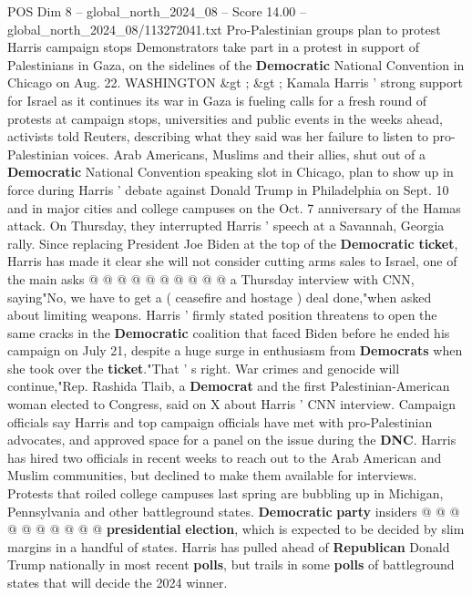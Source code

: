 \begin{textsample}{POS Dim 8 – global\_north\_2024\_08 – Score 14.00 – global\_north\_2024\_08/113272041.txt}  \label{ex:f8_pos_039}
Pro-Palestinian groups plan to protest Harris campaign stops Demonstrators take part in a protest in support of Palestinians in Gaza, on the sidelines of the \textbf{Democratic} National Convention in Chicago on Aug. 22.
WASHINGTON \&gt ; \&gt ; Kamala Harris ' strong support for Israel as it continues its war in Gaza is fueling calls for a fresh round of protests at campaign stops, universities and public events in the weeks ahead, activists told Reuters, describing what they said was her failure to listen to pro-Palestinian voices.
Arab Americans, Muslims and their allies, shut out of a \textbf{Democratic} National Convention speaking slot in Chicago, plan to show up in force during Harris ' debate against Donald Trump in Philadelphia on Sept. 10 and in major cities and college campuses on the Oct. 7 anniversary of the Hamas attack.
On Thursday, they interrupted Harris ' speech at a Savannah, Georgia rally.
Since replacing President Joe Biden at the top of the \textbf{Democratic} \textbf{ticket}, Harris has made it clear she will not consider cutting arms sales to Israel, one of the main asks @ @ @ @ @ @ @ @ @ @ a Thursday interview with CNN, saying"No, we have to get a ( ceasefire and hostage ) deal done,"when asked about limiting weapons.
Harris ' firmly stated position threatens to open the same cracks in the \textbf{Democratic} coalition that faced Biden before he ended his campaign on July 21, despite a huge surge in enthusiasm from \textbf{Democrats} when she took over the \textbf{ticket}."That ' s right.
War crimes and genocide will continue,"Rep.
Rashida Tlaib, a \textbf{Democrat} and the first Palestinian-American woman elected to Congress, said on X about Harris ' CNN interview.
Campaign officials say Harris and top campaign officials have met with pro-Palestinian advocates, and approved space for a panel on the issue during the \textbf{DNC}.
Harris has hired two officials in recent weeks to reach out to the Arab American and Muslim communities, but declined to make them available for interviews.
Protests that roiled college campuses last spring are bubbling up in Michigan, Pennsylvania and other battleground states. \textbf{Democratic} \textbf{party} insiders @ @ @ @ @ @ @ @ @ @ \textbf{presidential} \textbf{election}, which is expected to be decided by slim margins in a handful of states.
Harris has pulled ahead of \textbf{Republican} Donald Trump nationally in most recent \textbf{polls}, but trails in some \textbf{polls} of battleground states that will decide the 2024 winner.

\end{textsample}
